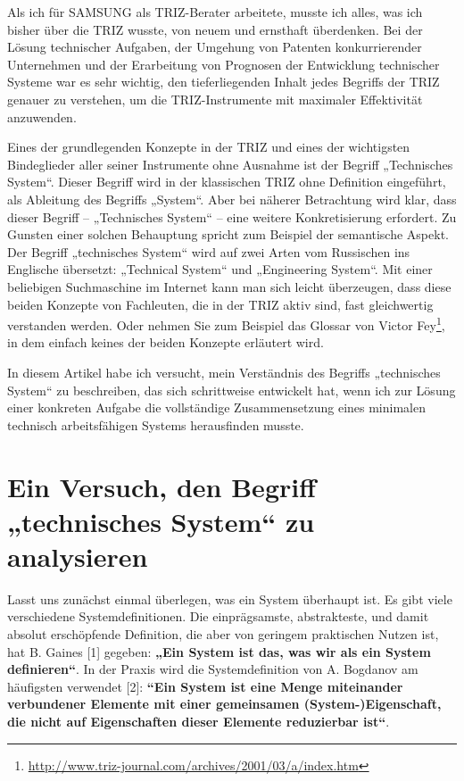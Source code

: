 \documentclass[11pt,a4paper]{article}
\begin{document}
Als ich für SAMSUNG als TRIZ-Berater arbeitete, musste ich alles, was ich
bisher über die TRIZ wusste, von neuem und ernsthaft überdenken. Bei der
Lösung technischer Aufgaben, der Umgehung von Patenten konkurrierender
Unternehmen und der Erarbeitung von Prognosen der Entwicklung technischer
Systeme war es sehr wichtig, den tieferliegenden Inhalt jedes Begriffs der
TRIZ genauer zu verstehen, um die TRIZ-Instrumente mit maximaler Effektivität
anzuwenden.

Eines der grundlegenden Konzepte in der TRIZ und eines der wichtigsten
Bindeglieder aller seiner Instrumente ohne Ausnahme ist der Begriff
„Technisches System“. Dieser Begriff wird in der klassischen TRIZ ohne
Definition eingeführt, als Ableitung des Begriffs „System“. Aber bei näherer
Betrachtung wird klar, dass dieser Begriff -- „Technisches System“ -- eine
weitere Konkretisierung erfordert. Zu Gunsten einer solchen Behauptung spricht
zum Beispiel der semantische Aspekt. Der Begriff „technisches System“ wird auf
zwei Arten vom Russischen ins Englische übersetzt: „Technical System“ und
„Engineering System“.  Mit einer beliebigen Suchmaschine im Internet kann man
sich leicht überzeugen, dass diese beiden Konzepte von Fachleuten, die in der
TRIZ aktiv sind, fast gleichwertig verstanden werden. Oder nehmen Sie zum
Beispiel das Glossar von Victor
Fey\footnote{\url{http://www.triz-journal.com/archives/2001/03/a/index.htm}},
in dem einfach keines der beiden Konzepte erläutert wird.

In diesem Artikel habe ich versucht, mein Verständnis des Begriffs
„technisches System“ zu beschreiben, das sich schrittweise entwickelt hat,
wenn ich zur Lösung einer konkreten Aufgabe die vollständige Zusammensetzung
eines minimalen technisch arbeitsfähigen Systems herausfinden musste.

\section*{Ein Versuch, den Begriff „technisches System“ zu analysieren}

Lasst uns zunächst einmal überlegen, was ein System überhaupt ist. Es gibt
viele verschiedene Systemdefinitionen. Die einprägsamste, abstrakteste, und
damit absolut erschöpfende Definition, die aber von geringem praktischen
Nutzen ist, hat B. Gaines [1] gegeben: \textbf{„Ein System ist das, was wir
  als ein System definieren“}.  In der Praxis wird die Systemdefinition von
A. Bogdanov am häufigsten verwendet [2]: \textbf{“Ein System ist eine Menge
  miteinander verbundener Elemente mit einer gemeinsamen (System-)Eigenschaft,
  die nicht auf Eigenschaften dieser Elemente reduzierbar ist“}.
\end{document}
